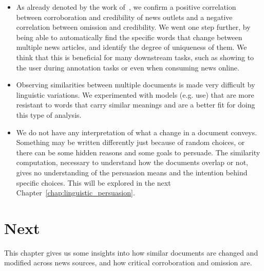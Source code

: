 \begin{itemize}
    \item As already denoted by the work of~\citet{bountouridis2018explaining}, we confirm a positive correlation between corroboration and credibility of news outlets and a negative correlation between omission and credibility. We went one step further, by being able to automatically find the specific words that change between multiple news articles, and identify the degree of uniqueness of them. We think that this is beneficial for many downstream tasks, such as showing to the user during annotation tasks or even when consuming news online. %
    \item Observing similarities between multiple documents is made very difficult by linguistic variations. We experimented with models (e.g. \acrshort{use}) that are more resistant to words that carry similar meanings and are a better fit for doing this type of analysis. %
    \item We do not have any interpretation of what a change in a document conveys. Something may be written differently just because of random choices, or there can be some hidden reasons and some goals to persuade. The similarity computation, necessary to understand how the documents overlap or not, gives no understanding of the persuasion means and the intention behind specific choices. This will be explored in the next Chapter~\ref{chap:linguistic_persuasion}.
\end{itemize}



\section{\statusgreen Next}
\label{sec:cgs_next}

This chapter gives us some insights into how similar documents are changed and modified across news sources, and how critical corroboration and omission are.

